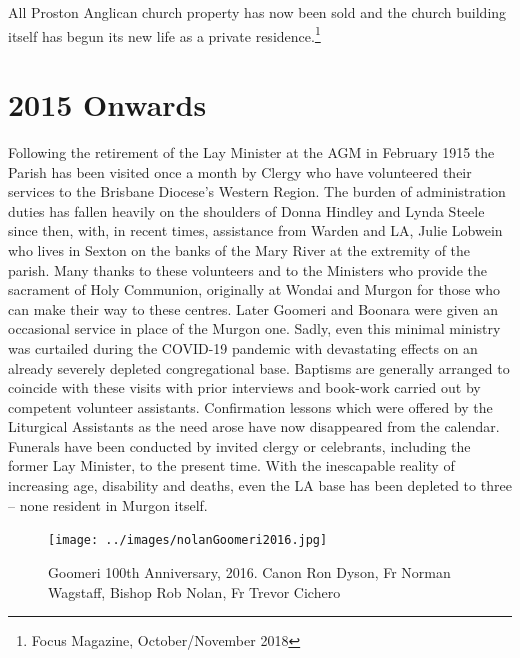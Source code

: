 All Proston Anglican church property has now been sold and the church building itself has begun its new life as a private residence.\footnote{Focus Magazine, October/November 2018}


\section{2015 Onwards}



Following the retirement of the Lay Minister at the AGM in February 1915 the Parish has been visited once a month by Clergy who have volunteered their services to the Brisbane Diocese's Western Region. The burden of administration duties has fallen heavily on the shoulders of Donna Hindley and Lynda Steele since then, with, in recent times, assistance from Warden and LA, Julie Lobwein who lives in Sexton on the banks of the Mary River at the extremity of the parish. Many thanks to these volunteers and to the Ministers who provide the sacrament of Holy Communion, originally at Wondai and Murgon for those who can make their way to these centres. Later Goomeri and Boonara were given an occasional service in place of the Murgon one. Sadly, even this minimal ministry was curtailed during the COVID-19 pandemic with devastating effects on an already severely depleted congregational base. Baptisms are generally arranged to coincide with these visits with prior interviews and book-work carried out by competent volunteer assistants. Confirmation lessons which were offered by the Liturgical Assistants as the need arose have now disappeared from the calendar. Funerals have been conducted by invited clergy or celebrants, including the former Lay Minister, to the present time. With the inescapable reality of increasing age, disability and deaths, even the LA base has been depleted to three -- none resident in Murgon itself.









\begin{figure}[!htb]
\begin{center}
\texttt{[image: ../images/nolanGoomeri2016.jpg]}
\caption{Goomeri 100th Anniversary, 2016. Canon Ron Dyson, Fr Norman Wagstaff, Bishop Rob Nolan, Fr Trevor Cichero}
\end{center}
\end{figure}




